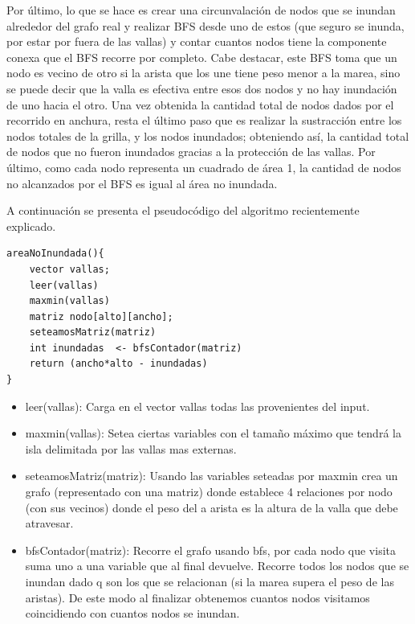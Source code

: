 \documentclass[a4paper, 12pt]{article}
\begin{document}
Por \'ultimo, lo que se hace es crear una circunvalaci\'on de nodos que se inundan alrededor del grafo real y realizar BFS desde uno de estos (que seguro se inunda, por estar por fuera de las vallas) y contar cuantos nodos tiene la componente conexa que el BFS recorre por completo. Cabe destacar, este BFS toma que un nodo es vecino de otro si la arista que los une tiene peso menor a la marea, sino se puede decir que la valla es efectiva entre esos dos nodos y no hay inundaci\'on de uno hacia el otro. Una vez obtenida la cantidad total de nodos dados por el recorrido en anchura, resta el \'ultimo paso que es realizar la sustracci\'on entre los nodos totales de la grilla, y los nodos inundados; obteniendo as\'i, la cantidad total de nodos que no fueron inundados gracias a la protecci\'on de las vallas. Por \'ultimo, como cada nodo representa un cuadrado de \'area 1, la cantidad de nodos no alcanzados por el BFS es igual al \'area no inundada.

A continuaci\'on se presenta el pseudoc\'odigo del algoritmo recientemente explicado.

\begin{verbatim}
areaNoInundada(){
	vector vallas;
	leer(vallas)
	maxmin(vallas)
	matriz nodo[alto][ancho];
	seteamosMatriz(matriz)
	int inundadas  <- bfsContador(matriz)
	return (ancho*alto - inundadas)
}
\end{verbatim}



\begin{itemize}
\item leer(vallas): Carga en el vector vallas todas las provenientes del input.

\item maxmin(vallas): Setea ciertas variables con el tama\~no m\'aximo que tendrá la isla delimitada por las vallas mas externas.

\item seteamosMatriz(matriz): Usando las variables seteadas por maxmin crea un grafo (representado con una matriz) donde establece 4 relaciones por nodo (con sus vecinos) donde el peso del a arista es la altura de la valla que debe atravesar.

\item bfsContador(matriz): Recorre el grafo usando bfs, por cada nodo que visita suma uno a una variable que al final devuelve. Recorre todos los nodos que se inundan dado q son los que se relacionan (si la marea supera el peso de las aristas). De este modo al finalizar obtenemos cuantos nodos visitamos coincidiendo con cuantos nodos se inundan.
\end{itemize}
\end{document}
